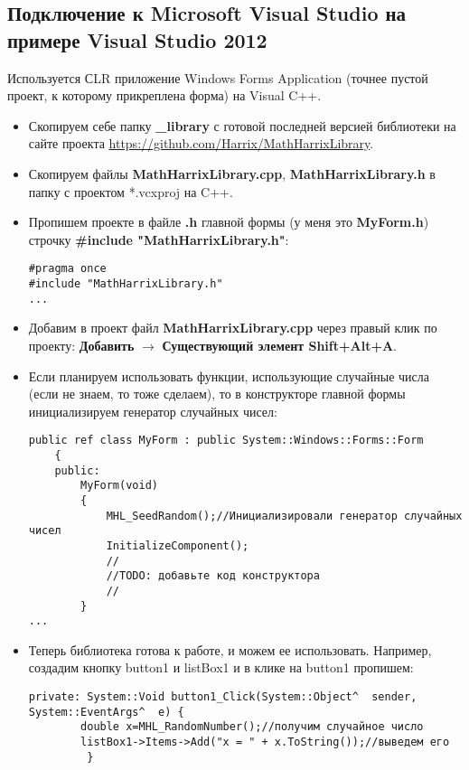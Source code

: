 \documentclass[a4paper,12pt]{article}
\begin{document}
\subsection{Подключение к Microsoft Visual Studio на примере Visual Studio 2012}

Используется СLR приложение Windows Forms Application (точнее пустой проект, к которому прикреплена форма) на Visual C++.

\begin{itemize}
\item Скопируем себе папку \textbf{\_library} с готовой последней версией библиотеки на сайте проекта \href{https://github.com/Harrix/MathHarrixLibrary}{https://github.com/Harrix/MathHarrixLibrary}.

\item Скопируем файлы \textbf{MathHarrixLibrary.cpp}, \textbf{MathHarrixLibrary.h} в папку с проектом *.vcxproj на C++.

\item Пропишем проекте в файле \textbf{.h} главной формы (у меня это \textbf{MyForm.h}) строчку \textbf{\#include "MathHarrixLibrary.h"}:
\begin{lstlisting}[label=install_code_07,caption=Подключение библиотеки]
#pragma once
#include "MathHarrixLibrary.h"
...
\end{lstlisting}

\item Добавим в проект файл \textbf{MathHarrixLibrary.cpp} через правый клик по проекту: \textbf{Добавить} $\rightarrow$ \textbf{Существующий элемент Shift+Alt+A}.

\item Если планируем использовать функции, использующие случайные числа (если не знаем, то тоже сделаем), то в конструкторе главной формы инициализируем генератор случайных чисел:
\begin{lstlisting}[label=install_code_08,caption=Инициализация генератора случайных чисел]
	public ref class MyForm : public System::Windows::Forms::Form
	{
	public:
		MyForm(void)
		{
			MHL_SeedRandom();//Инициализировали генератор случайных чисел
			InitializeComponent();
			//
			//TODO: добавьте код конструктора
			//
		}
...
\end{lstlisting}

\item Теперь библиотека готова к работе, и можем ее использовать. Например, создадим кнопку button1 и listBox1 и в клике на button1 пропишем:
\begin{lstlisting}[label=install_code_09,caption=Пример использования]
private: System::Void button1_Click(System::Object^  sender, System::EventArgs^  e) {
 		double x=MHL_RandomNumber();//получим случайное число
 		listBox1->Items->Add("x = " + x.ToString());//выведем его
 		 }
\end{lstlisting}
\end{itemize}
\end{document}
